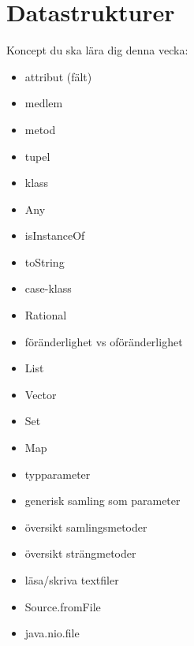 \chapter{Datastrukturer}\label{chapter:W04}
Koncept du ska lära dig denna vecka:
\begin{multicols}{2}\begin{itemize}[nosep,label={$\square$},leftmargin=*]
\item attribut (fält)
\item medlem
\item metod
\item tupel
\item klass
\item Any
\item isInstanceOf
\item toString
\item case-klass
\item Rational
\item föränderlighet vs oföränderlighet
\item List
\item Vector
\item Set
\item Map
\item typparameter
\item generisk samling som parameter
\item översikt samlingsmetoder
\item översikt strängmetoder
\item läsa/skriva textfiler
\item Source.fromFile
\item java.nio.file\end{itemize}\end{multicols}
